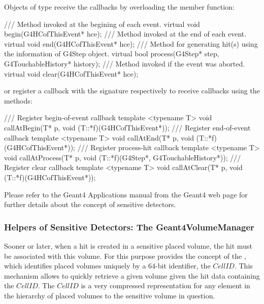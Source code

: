 \documentclass[10pt,a4paper]{article}
\begin{document}
\noindent
Objects of type  receive the callbacks by overloading the 
member function:
\begin{unnumberedcode}
  /// Method invoked at the begining of each event.
  virtual void begin(G4HCofThisEvent* hce);
  /// Method invoked at the end of each event.
  virtual void end(G4HCofThisEvent* hce);
  /// Method for generating hit(s) using the information of G4Step object.
  virtual bool process(G4Step* step, G4TouchableHistory* history);
  /// Method invoked if the event was aborted.
  virtual void clear(G4HCofThisEvent* hce);
\end{unnumberedcode}
or register a callback with the signature {}
respectively {} 
to receive callbacks using the methods:
\begin{unnumberedcode}
  /// Register begin-of-event callback
  template <typename T> void callAtBegin(T* p, void (T::*f)(G4HCofThisEvent*));
  /// Register end-of-event callback
  template <typename T> void callAtEnd(T* p, void (T::*f)(G4HCofThisEvent*));
  /// Register process-hit callback
  template <typename T> void callAtProcess(T* p, void (T::*f)(G4Step*, G4TouchableHistory*));
  /// Register clear callback
  template <typename T> void callAtClear(T* p, void (T::*f)(G4HCofThisEvent*));
\end{unnumberedcode}
Please refer to the Geant4 Applications manual from the Geant4 web page for 
further details about the concept of sensitive detectors.

\subsubsection{Helpers of Sensitive Detectors: The Geant4VolumeManager}
\label{sec:ddg4-user-manual-geant4volumemanager}%

\noindent
Sooner or later, when a hit is created in a sensitive placed volume, the
hit must be associated with this volume. For this purpose \DDhep provides 
the concept of the , which identifies placed volumes uniquely 
by a 64-bit identifier, the $CellID$. This mechanism allows to quickly
retrieve a given volume given the hit data containing the $CellID$.
The $CellID$ is a very compressed representation for any element in the 
hierarchy of placed volumes to the sensitive volume in question.
\end{document}
